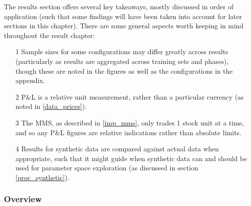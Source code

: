 \documentclass[a4paper,11pt,oneside]{article}
\theoremstyle{plain}
\theoremstyle{definition}
\begin{document}
The results section offers several key takeaways, mostly discussed in order of application (such that some findings will have been taken into account for later sections in this chapter). There are some general aspects worth keeping in mind throughout the result chapter:
\begin{itemize}
	\item[1] Sample sizes for some configurations may differ greatly across results (particularly as results are aggregated across training sets and phases), though these are noted in the figures as well as the configurations in the appendix.
	\item[2] P\&L is a relative unit measurement, rather than a particular currency (as noted in \ref{data_prices}).
	\item[3] The MMS, as described in \ref{imp_mms}, only trades 1 stock unit at a time, and so any P\&L figures are relative indications rather than absolute limits.
	\item[4]  Results for synthetic data are compared against actual data when appropriate, such that it might guide when synthetic data can and should be used for parameter space exploration (as discussed in section \ref{proc_synthetic}).
\end{itemize}

\subsubsection{Overview}
\end{document}

